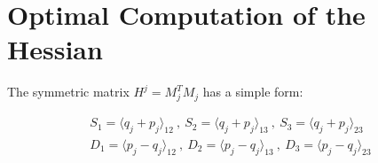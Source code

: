 \documentclass{birkjour}
\numberwithin{equation}{section}
\begin{document}
%
%
%
%

\section{Optimal Computation of the Hessian}

The symmetric matrix $H^j = M_j^T M_j$ has a simple form:

\begin{eqnarray*}
S_1 = \langle q_j + p_j \rangle_{12} \ , \ S_2 = \langle q_j + p_j \rangle_{13} \ , \ S_3 = \langle q_j + p_j \rangle_{23}\\
D_1 = \langle p_j - q_j \rangle_{12} \ , \ D_2 = \langle p_j - q_j \rangle_{13} \ , \ D_3 = \langle p_j - q_j \rangle_{23}
\end{eqnarray*}
\end{document}
